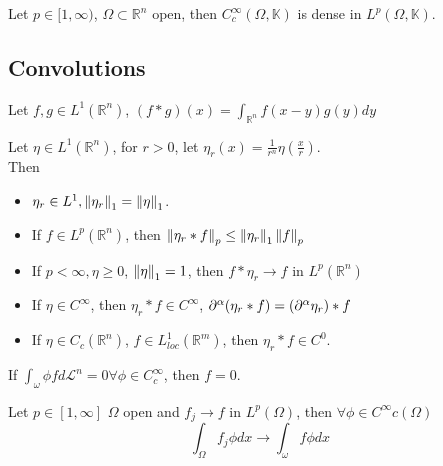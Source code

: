 \documentclass[../main.tex]{subfiles}
\begin{document}
\begin{thm}
	Let $p \in [ 1, \infty ) $, $\Omega \subset \mathbb{R}^n$ open, then $C^{ \infty }_c ( \Omega, \mathbb{K}) $ is dense in $L^{p}( \Omega, \mathbb{K}) $.\\
\end{thm}
\subsection{Convolutions}
Let $f,g \in L^{1}(  \mathbb{R}^{n}) $, $( f\ast g) ( x) = \int_{ \mathbb{R}^n }^{  } f( x-y) g( y) dy$ 
\begin{lemma}
Let $\eta\in L^{1}( \mathbb{R}^n) $, for $r>0$, let $\eta_r( x) = \frac{1}{r^{n}}\eta( \frac{x}{r}) $.\\
Then
\begin{itemize}
\item $\eta_r\in L^{1}, \left\lVert \eta_r\right\rVert_1 = \left\lVert \eta\right\rVert_1$.
\item If $f\in L^{p}( \mathbb{R}^n) $, then $ \left\lVert \eta_r \ast f\right\rVert_p \leq  \left\lVert \eta_r\right\rVert_{1} \left\lVert f\right\rVert_p$ 
\item If $p< \infty , \eta \geq 0$, $\left\lVert \eta\right\rVert_1 =1$, then $f\ast \eta_r \to f$ in $L^{p}(  \mathbb{R}^n) $ 
\item If $\eta \in C^{ \infty }$, then $\eta_r \ast f \in C^{ \infty }$, $\partial^{\alpha}( \eta_r \ast f) = ( \partial^{\alpha} \eta_r) \ast f$ 
\item If $\eta\in C_c( \mathbb{R}^n) $, $ f \in L^{1}_{loc} ( \mathbb{R}^m) $, then $\eta_r \ast f\in C^{0}$.\\
\end{itemize}
\end{lemma}
\begin{lemma}
If $ \int_\omega \phi f d \mathcal{L}^{n}=0 \forall \phi \in C^{ \infty }_c$, then $f=0$.
\end{lemma}
\begin{lemma}
Let $p \in [ 1, \infty ] $ $\Omega$ open and $f_j \to f$ in $L^{p}( \Omega) $, then $\forall \phi \in C^\infty c( \Omega) $
\[ 
\int_{ \Omega }^{  } f_j \phi dx \to \int_\omega f \phi dx
\]
\end{lemma}
\end{document}
